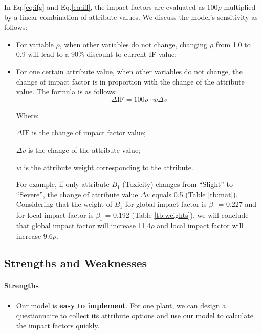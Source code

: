 \documentclass[12pt]{article}
\begin{document}
		In Eq.\ref{eq:ifg} and Eq.\ref{eq:ifl}, the impact factors are evaluated as 100$\rho$ multiplied by a linear combination of attribute values.  We discuss the model's sensitivity as follows:
		\vspace{-0.2cm}
		\begin{itemize}
			\item For variable $\rho$, when other variables do not change, changing $\rho$ from 1.0 to 0.9 will lead to a 90\% discount to current IF value;
			\vspace{-0.2cm}
			\item For one certain attribute value, when other variables do not change, the change of impact factor is in proportion with the change of the attribute value.  The formula is as follows:
			\[
				\Delta\mathrm{IF} = 100\rho\cdot w\Delta v
			\]
			
			Where:
			
			{
			\setlength{\parindent}{2em}
			$\Delta\mathrm{IF}$ is the change of impact factor value;
			
			\vspace{-0.15cm}
			$\Delta v$ is the change of the attribute value;
			
			\vspace{-0.15cm}
			$w$ is the attribute weight corresponding to the attribute.
			}
			
			\vspace{0.15cm}
			
			For example, if only attribute $B_1$ (Toxicity) changes from ``Slight'' to ``Severe'', the change of attribute value $\Delta v$ equals 0.5 (Table \ref{tb:mat}).  Considering that the weight of $B_1$ for global impact factor is $\beta_1$ = 0.227 and for local impact factor is $\beta_1$ = 0.192 (Table \ref{tb:weights}), we will conclude that global impact factor will increase 11.4$\rho$ and local impact factor will increase 9.6$\rho$.
			
		\end{itemize} 
		
		
	\subsection{Strengths and Weaknesses}

		\paragraph{Strengths}
		\vspace{-0.1cm}
		\begin{itemize}
			\vspace{-0.3cm}
			\item Our model is \textbf{easy to implement}.  For one plant, we can design a questionnaire to collect its attribute options and use our model to calculate the impact factors quickly.
		\end{itemize}
		
\end{document}
